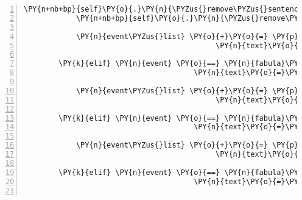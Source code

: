 \begin{Verbatim}[commandchars=\\\{\},numbers=left,firstnumber=1,stepnumber=1]
            \PY{n+nb+bp}{self}\PY{o}{.}\PY{n}{\PYZus{}remove\PYZus{}sentence}\PY{p}{(}\PY{n}{ID\PYZus{}CASSANDRA}\PY{p}{,} \PY{l+s}{\PYZsq{}}\PY{l+s}{Mit wem habe ich die Ehre?}\PY{l+s}{\PYZsq{}}\PY{p}{)}
            \PY{n+nb+bp}{self}\PY{o}{.}\PY{n}{\PYZus{}remove\PYZus{}sentence}\PY{p}{(}\PY{n}{ID\PYZus{}KUNI}\PY{p}{,} \PY{l+s}{\PYZsq{}}\PY{l+s}{Hallo, ich bin der Gnom Kuni.}\PY{l+s}{\PYZsq{}}\PY{p}{)}

            \PY{n}{event\PYZus{}list} \PY{o}{+}\PY{o}{=} \PY{p}{[}\PY{n}{fabula}\PY{o}{.}\PY{n}{SaysEvent}\PY{p}{(}\PY{n}{identifier}\PY{o}{=}\PY{n}{ID\PYZus{}KUNI}\PY{p}{,}
                                            \PY{n}{text}\PY{o}{=}\PY{l+s}{\PYZsq{}}\PY{l+s}{Hallo, ich bin der Gnom Kuni.}\PY{l+s}{\PYZsq{}}\PY{p}{)}\PY{p}{]}

        \PY{k}{elif} \PY{n}{event} \PY{o}{==} \PY{n}{fabula}\PY{o}{.}\PY{n}{SaysEvent}\PY{p}{(}\PY{n}{identifier}\PY{o}{=}\PY{n}{ID\PYZus{}KUNI}\PY{p}{,}
                                       \PY{n}{text}\PY{o}{=}\PY{l+s}{\PYZsq{}}\PY{l+s}{Ich suche den Weg zum Zauberwald!}\PY{l+s}{\PYZsq{}}\PY{p}{)}\PY{p}{:}

            \PY{n}{event\PYZus{}list} \PY{o}{+}\PY{o}{=} \PY{p}{[}\PY{n}{fabula}\PY{o}{.}\PY{n}{SaysEvent}\PY{p}{(}\PY{n}{identifier}\PY{o}{=}\PY{n}{ID\PYZus{}CASSANDRA}\PY{p}{,}
                                            \PY{n}{text}\PY{o}{=}\PY{l+s}{\PYZsq{}}\PY{l+s}{Ich ebenfalls.}\PY{l+s}{\PYZsq{}}\PY{p}{)}\PY{p}{]}

        \PY{k}{elif} \PY{n}{event} \PY{o}{==} \PY{n}{fabula}\PY{o}{.}\PY{n}{SaysEvent}\PY{p}{(}\PY{n}{identifier}\PY{o}{=}\PY{n}{ID\PYZus{}CASSANDRA}\PY{p}{,}
                                       \PY{n}{text}\PY{o}{=}\PY{l+s}{\PYZsq{}}\PY{l+s}{Ich bin auf einer Reise, die mich durch den Zauberwald führt!}\PY{l+s}{\PYZsq{}}\PY{p}{)}\PY{p}{:}

            \PY{n}{event\PYZus{}list} \PY{o}{+}\PY{o}{=} \PY{p}{[}\PY{n}{fabula}\PY{o}{.}\PY{n}{SaysEvent}\PY{p}{(}\PY{n}{identifier}\PY{o}{=}\PY{n}{ID\PYZus{}KUNI}\PY{p}{,}
                                            \PY{n}{text}\PY{o}{=}\PY{l+s}{\PYZsq{}}\PY{l+s}{Ich auch.}\PY{l+s}{\PYZsq{}}\PY{p}{)}\PY{p}{]}

        \PY{k}{elif} \PY{n}{event} \PY{o}{==} \PY{n}{fabula}\PY{o}{.}\PY{n}{SaysEvent}\PY{p}{(}\PY{n}{identifier}\PY{o}{=}\PY{n}{ID\PYZus{}CASSANDRA}\PY{p}{,}
                                       \PY{n}{text}\PY{o}{=}\PY{l+s}{\PYZsq{}}\PY{l+s}{Willst du ein Stück Kuchen?}\PY{l+s}{\PYZsq{}}\PY{p}{)}\PY{p}{:}


\end{Verbatim}
